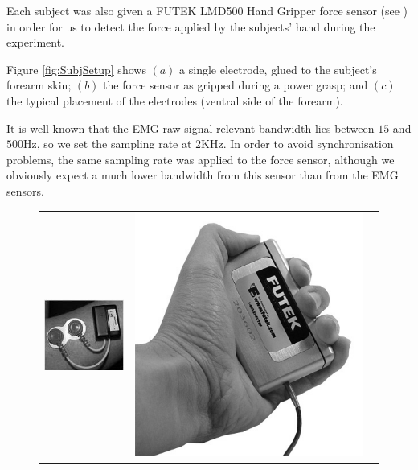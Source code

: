 Each subject was also given a FUTEK LMD500 Hand Gripper force sensor
(see \cite{...}) in order for us to detect the force applied by the
subjects' hand during the experiment.

Figure \ref{fig:SubjSetup} shows $(a)$ a single electrode, glued to
the subject's forearm skin; $(b)$ the force sensor as gripped during a
power grasp; and $(c)$ the typical placement of the electrodes
(ventral side of the forearm).

It is well-known that the EMG raw signal relevant bandwidth lies
between $15$ and $500$Hz, so we set the sampling rate at $2$KHz. In
order to avoid synchronisation problems, the same sampling rate was
applied to the force sensor, although we obviously expect a much lower
bandwidth from this sensor than from the EMG sensors.

\begin{figure}[!t] \centering
  \begin{tabular}{ccc}
    \includegraphics[height=0.16\textheight]{figs/Electrode} &
    \includegraphics[height=0.16\textheight]{figs/Hand_Gripper} &

\end{tabular}
\end{figure}

